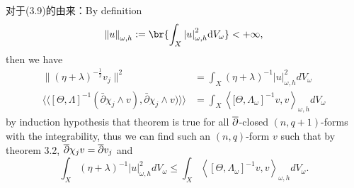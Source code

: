 \documentclass[lang=cn,zihao=-4,a4paper,fontset=none]{beautybook}
\begin{document}
对于(3.9)的由来：By definition \[\norm{u}_{\omega,h}:=\br{\int_X \abs{u}^2_{\omega,h}\dd V_{\omega}}<+\infty,\] then we have 
\begin{align*}
    \|(\eta+\lambda)^{-\frac 12}v_j\|^2 &=\int_X(\eta+\lambda)^{-1}|u|_{\omega, h}^2 d V_\omega \\ 
\langle\langle[\Theta,\Lambda]^{-1}(\bar\partial\chi_j\wedge v),\bar\partial\chi_j\wedge v)\rangle\rangle &=\int_X\left\langle\left.[\Theta, \Lambda_\omega\right]^{-1} v, v\right\rangle_{\omega, h} d V_\omega
\end{align*}
    by induction hypothesis that theorem is true for all $\overline{\partial}$-closed $(n,q+1)$-forms with the integrability, thus we can find such an $(n,q)$-form $v$ such that by theorem 3.2, $\overline{\partial} \chi_j v=\overline{\partial} v_j$ and \[\int_X(\eta+\lambda)^{-1}|u|_{\omega, h}^2 d V_\omega \leq \int_X\left\langle\left[\Theta, \Lambda_\omega\right]^{-1} v, v\right\rangle_{\omega, h} d V_\omega.\]
\end{document}
